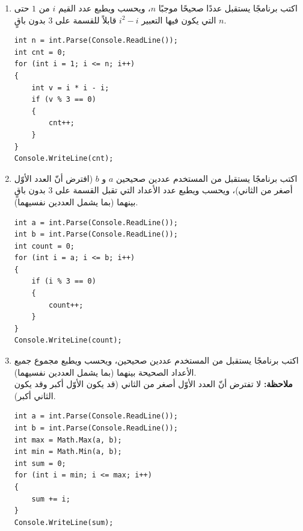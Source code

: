 \documentclass[14pt]{extarticle}
\begin{document}
\begin{enumerate}[resume, itemsep=2em]
\item اكتب برنامجًا يستقبل عددًا صحيحًا موجبًا $n$، ويحسب ويطبع عدد القيم $i$ من $1$ حتى $n$ التي يكون فيها التعبير $i^2 - i$ قابلاً للقسمة على $3$ بدون باقٍ.
\ifwithsols
\begin{boxSolution}
\begin{english}
\begin{verbatim}
int n = int.Parse(Console.ReadLine());
int cnt = 0;
for (int i = 1; i <= n; i++)
{
    int v = i * i - i;
    if (v % 3 == 0)
    {
        cnt++;
    }
}
Console.WriteLine(cnt);
\end{verbatim}
\end{english}
\end{boxSolution}
\fi
\filbreak

\item اكتب برنامجًا يستقبل من المستخدم عددين صحيحين $a$ و $b$ (افترض أنّ العدد الأوّل أصغر من الثاني)، ويحسب ويطبع عدد الأعداد التي تقبل القسمة على $3$ بدون باقٍ بينهما (بما يشمل العددين نفسيهما).
\ifwithsols
\begin{boxSolution}
\begin{english}
\begin{verbatim}
int a = int.Parse(Console.ReadLine());
int b = int.Parse(Console.ReadLine());
int count = 0;
for (int i = a; i <= b; i++)
{
    if (i % 3 == 0)
    {
        count++;
    }
}
Console.WriteLine(count);
\end{verbatim}
\end{english}
\end{boxSolution}
\fi
\filbreak

\item اكتب برنامجًا يستقبل من المستخدم عددين صحيحين، ويحسب ويطبع مجموع جميع الأعداد الصحيحة بينهما (بما يشمل العددين نفسيهما). \\
\textbf{ملاحظة:} لا تفترض أنّ العدد الأوّل أصغر من الثاني (قد يكون الأوّل أكبر وقد يكون الثاني أكبر).
\ifwithsols
\begin{boxSolution}
\begin{english}
\begin{verbatim}
int a = int.Parse(Console.ReadLine());
int b = int.Parse(Console.ReadLine());
int max = Math.Max(a, b);
int min = Math.Min(a, b);
int sum = 0;
for (int i = min; i <= max; i++)
{
    sum += i;
}
Console.WriteLine(sum);
\end{verbatim}
\end{english}
\end{boxSolution}
\fi
\filbreak


\end{enumerate}
\end{document}
